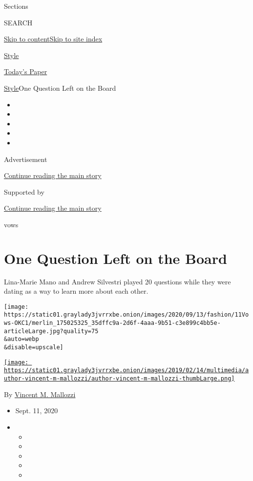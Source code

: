 Sections

SEARCH

\protect\hyperlink{site-content}{Skip to
content}\protect\hyperlink{site-index}{Skip to site index}

\href{https://www.nytimes3xbfgragh.onion/section/style}{Style}

\href{https://myaccount.nytimes3xbfgragh.onion/auth/login?response_type=cookie\&client_id=vi}{}

\href{https://www.nytimes3xbfgragh.onion/section/todayspaper}{Today's
Paper}

\href{/section/style}{Style}\textbar{}One Question Left on the Board

\begin{itemize}
\item
\item
\item
\item
\item
\end{itemize}

Advertisement

\protect\hyperlink{after-top}{Continue reading the main story}

Supported by

\protect\hyperlink{after-sponsor}{Continue reading the main story}

vows

\hypertarget{one-question-left-on-the-board}{%
\section{One Question Left on the
Board}\label{one-question-left-on-the-board}}

Lina-Marie Mano and Andrew Silvestri played 20 questions while they were
dating as a way to learn more about each other.

\texttt{[image: https://static01.graylady3jvrrxbe.onion/images/2020/09/13/fashion/11Vows-OKC1/merlin\_175025325\_35dffc9a-2d6f-4aaa-9b51-c3e899c4bb5e-articleLarge.jpg?quality=75\\\&auto=webp\\\&disable=upscale]}

\href{https://www.nytimes3xbfgragh.onion/by/vincent-m-mallozzi}{\texttt{[image: https://static01.graylady3jvrrxbe.onion/images/2019/02/14/multimedia/author-vincent-m-mallozzi/author-vincent-m-mallozzi-thumbLarge.png]}}

By
\href{https://www.nytimes3xbfgragh.onion/by/vincent-m-mallozzi}{Vincent
M. Mallozzi}

\begin{itemize}
\item
  Sept. 11, 2020
\item
  \begin{itemize}
  \item
  \item
  \item
  \item
  \item
  \end{itemize}
\end{itemize}

